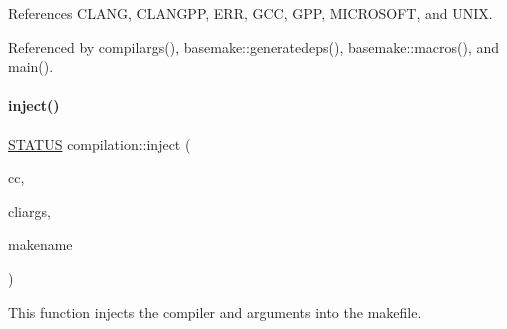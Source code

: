 References C\+L\+A\+NG, C\+L\+A\+N\+G\+PP, E\+RR, G\+CC, G\+PP, M\+I\+C\+R\+O\+S\+O\+FT, and U\+N\+IX.



Referenced by compilargs(), basemake\+::generatedeps(), basemake\+::macros(), and main().

\mbox{\label{namespacecompilation_a8903c2b63e13907904d398bca6d64d9f}} 
\paragraph{\texorpdfstring{inject()}{inject()}}
{\footnotesize\ttfamily \mbox{\hyperlink{functions_8h_a32c27cc471df37f4fc818d65de0a56c4}{S\+T\+A\+T\+US}} compilation\+::inject (\begin{DoxyParamCaption}\item[{\mbox{\hyperlink{namespacecompilation_ab8b552e73f4f5a4912982468f052f089}{C\+O\+M\+P\+IL}}}]{cc,  }\item[{std\+::string}]{cliargs,  }\item[{std\+::string}]{makename }\end{DoxyParamCaption})}



This function injects the compiler and arguments into the makefile. 

